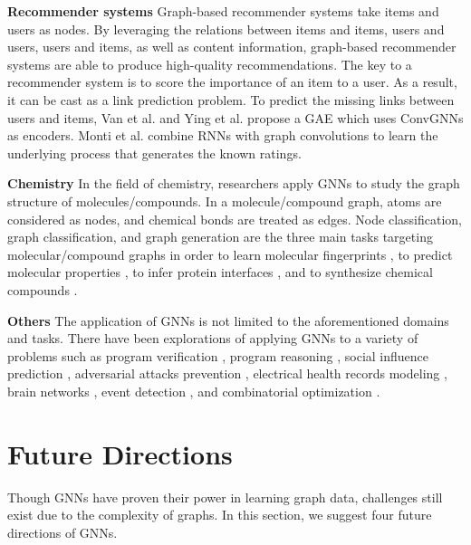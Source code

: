     
    \vspace{2mm}\noindent\textbf{Recommender systems}
    Graph-based recommender systems take items and users as nodes. By leveraging the relations between items and items, users and users, users and items, as well as content information, graph-based recommender systems are able to produce high-quality recommendations. The key to a recommender system is to score the importance of an item to a user. As a result, it can be cast as a link prediction problem. To predict the missing links between users and items, Van et al. \cite{van2017graph} and Ying et al. \cite{ying2018graph} propose a GAE which uses ConvGNNs as encoders. Monti et al. \cite{monti2017geometricb} combine RNNs with graph convolutions to learn the underlying process that generates the known ratings.
    

    
    
    \vspace{2mm}\noindent\textbf{Chemistry} In the field of chemistry, researchers apply GNNs to study the graph structure of molecules/compounds. In a molecule/compound graph, atoms are considered as nodes, and chemical bonds are treated as edges. Node classification, graph classification,  and graph generation are the three main tasks targeting molecular/compound graphs in order to  learn molecular fingerprints \cite{duvenaud2015convolutional,kearnes2016molecular}, to predict molecular properties \cite{gilmer2017neural}, to infer protein interfaces \cite{fout2017protein}, and to synthesize chemical compounds \cite{li2018learning,de2018molgan,you2018graph}.
	
	
	
	\vspace{2mm}\noindent\textbf{Others} The application of GNNs is not limited to the aforementioned domains and tasks.
	There have been explorations of applying GNNs to a variety of problems such as program verification \cite{li2015gated}, program reasoning \cite{allamanis2017learning}, social influence prediction \cite{qiu2018deepinf}, adversarial attacks prevention \cite{zugner2018adversarial}, electrical health records modeling \cite{choi2017gram,choi2018mime}, brain networks \cite{kawahara2017brainnetcnn}, event detection \cite{nguyen2018graph}, and combinatorial optimization \cite{li2018combinatorial}.

	

	\section{Future Directions}\label{sec:fucture}
	Though GNNs have proven their power in learning graph data,  challenges still exist due to the complexity of graphs. In this section, we suggest four future directions of GNNs.
	
